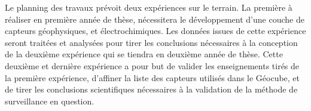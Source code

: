 \documentclass{themeensg}
\begin{document}
\begin{appendices}
Le planning des travaux prévoit deux expériences sur le terrain. La première à réaliser en première année de thèse, nécessitera le développement d'une couche de capteurs géophysiques, et électrochimiques. Les données issues de cette expérience seront traitées et analysées pour tirer les conclusions nécessaires à la conception de la deuxième expérience qui se tiendra en deuxième année de thèse. Cette deuxième et dernière expérience a pour but de valider les enseignements tirés de la première expérience, d'affiner la liste des capteurs utilisés dans le Géocube, et de tirer les conclusions scientifiques nécessaires à la validation de la méthode de surveillance en question.



\end{appendices} 
\end{document}
